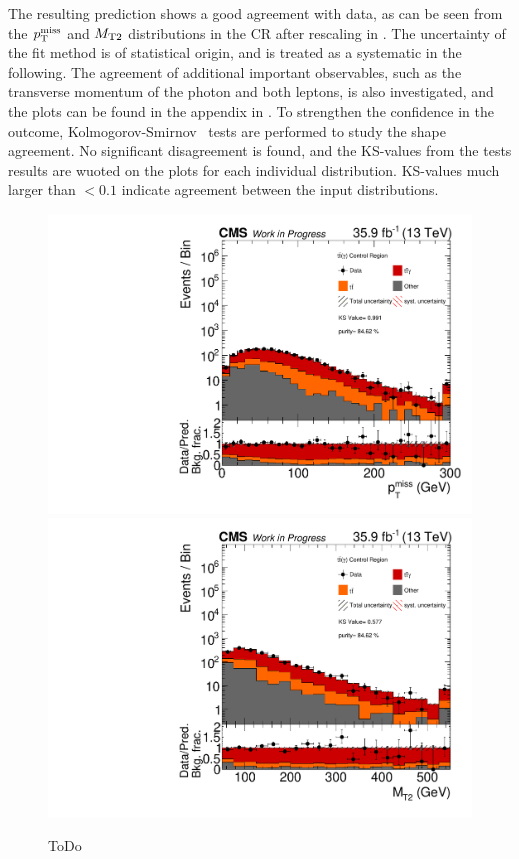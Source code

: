 The resulting prediction shows a good agreement with data, as can be seen from the $p_{\mathrm{T}}^\text{miss}$ and $M_{\mathrm{T2}}$ distributions in the CR after rescaling in . The uncertainty of the fit method is of statistical origin, and is treated as a systematic in the following. The agreement of additional important observables, such as the transverse momentum of the photon and both leptons, is also investigated, and the plots can be found in the appendix in . To strengthen the confidence in the outcome, Kolmogorov-Smirnov~\cite{KS} tests are performed to study the shape agreement. No significant disagreement is found, and the KS-values from the tests results are wuoted on the plots for each individual distribution. KS-values much larger than $<0.1$ indicate agreement between the input distributions.
\begin{figure}[tbp]
 \centering
 \includegraphics[width=\pairwidth]{figures/plots_CR_tt/CRTT_EM_nom_met_log}
 \includegraphics[width=\pairwidth]{figures/plots_CR_tt/CRTT_EM_nom_mt2_log}
 \caption{ToDo}
 \label{fig:CRTT}
\end{figure}
